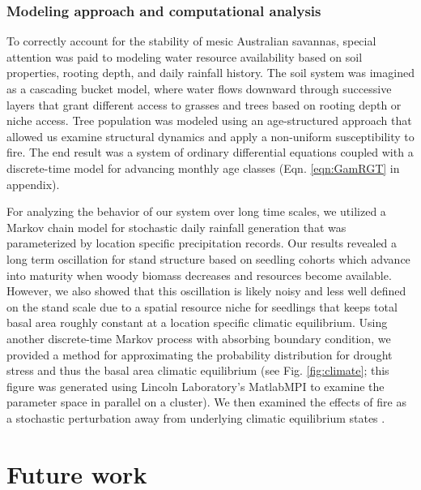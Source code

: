 \documentclass[11pt]{article}
\begin{document}
\subsubsection{Modeling approach and computational analysis}

To correctly account for the stability of mesic Australian savannas, special attention was paid to modeling water resource availability based on soil properties, rooting depth, and daily rainfall history. The soil system was imagined as a cascading bucket model, where water flows downward through successive layers that grant different access to grasses and trees based on rooting depth or niche access. Tree population was modeled using an age-structured approach that allowed us examine structural dynamics and apply a non-uniform susceptibility to fire. The end result was a system of ordinary differential equations coupled with a discrete-time model for advancing monthly age classes (Eqn. \ref{eqn:GamRGT} in appendix).

For analyzing the behavior of our system over long time scales, we utilized a Markov chain model for stochastic daily rainfall generation that was parameterized by location specific precipitation records. Our results revealed a long term oscillation for stand structure based on seedling cohorts which advance into maturity when woody biomass decreases and resources become available. However, we also showed that this oscillation is likely noisy and less well defined on the stand scale due to a spatial resource niche for seedlings that keeps total basal area roughly constant at a location specific climatic equilibrium. Using another discrete-time Markov process with absorbing boundary condition, we provided a method for approximating the probability distribution for drought stress and thus the basal area climatic equilibrium (see Fig. \ref{fig:climate}; this figure was generated using Lincoln Laboratory's MatlabMPI \cite{MatlabMPI} to examine the parameter space in parallel on a cluster). We then examined the effects of fire as a stochastic perturbation away from underlying climatic equilibrium states \cite{Strickland14}.

\section{Future work}
\label{sec:future}
\end{document}
